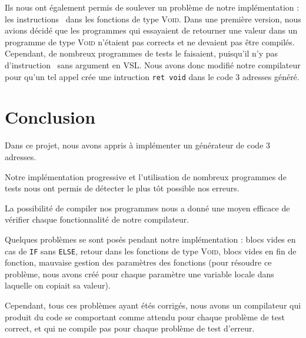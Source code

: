\documentclass[french]{article}
\begin{document}
Ils nous ont également permis de soulever un problème de notre implémentation : les instructions \return\ dans les fonctions de type \textsc{Void}. Dans une première version, nous avions décidé que les programmes qui essayaient de retourner une valeur dans un programme de type \textsc{Void} n'étaient pas corrects et ne devaient pas être compilés. Cependant, de nombreux programmes de tests le faisaient, puisqu'il n'y pas d'instruction \return\ sans argument en VSL. Nous avons donc modifié notre compilateur pour qu'un tel appel crée une intruction \texttt{ret void} dans le code 3 adresses généré.

\section{Conclusion}
Dans ce projet, nous avons appris à implémenter un générateur de code 3 adresses.

Notre implémentation progressive et l'utilisation de nombreux programmes de tests nous ont permis de détecter le plus tôt possible nos erreurs.

La possibilité de compiler nos programmes nous a donné une moyen efficace de vérifier chaque fonctionnalité de notre compilateur.

Quelques problèmes se sont posés pendant notre implémentation : blocs vides en cas de \texttt{IF} sans \texttt{ELSE}, retour dans les fonctions de type \textsc{Void}, blocs vides en fin de fonction, mauvaise gestion des paramètres des fonctions (pour résoudre ce problème, nous avons créé pour chaque paramètre une variable locale dans laquelle on copiait sa valeur).

Cependant, tous ces problèmes ayant étés corrigés, nous avons un compilateur qui produit du code se comportant comme attendu pour chaque problème de test correct, et qui ne compile pas pour chaque problème de test d'erreur.
\end{document}
